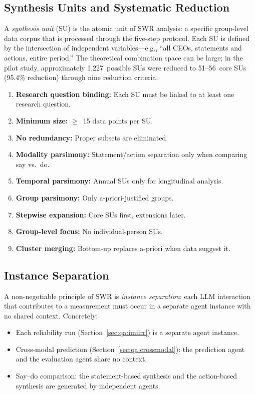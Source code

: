 \documentclass[11pt,a4paper]{article}
\begin{document}
\subsection{Synthesis Units and Systematic Reduction}
\label{sec:method:su}

A \emph{synthesis unit} (SU) is the atomic unit of SWR analysis: a specific group-level data corpus that is processed through the five-step protocol. Each SU is defined by the intersection of independent variables---e.g., ``all CEOs, statements and actions, entire period.'' The theoretical combination space can be large; in the pilot study, approximately 1,227~possible SUs were reduced to 51--56~core SUs (95.4\% reduction) through nine reduction criteria:

\begin{enumerate}[nosep]
  \item \textbf{Research question binding:} Each SU must be linked to at least one research question.
  \item \textbf{Minimum size:} $\geq$~15 data points per SU.
  \item \textbf{No redundancy:} Proper subsets are eliminated.
  \item \textbf{Modality parsimony:} Statement/action separation only when comparing say vs.\ do.
  \item \textbf{Temporal parsimony:} Annual SUs only for longitudinal analysis.
  \item \textbf{Group parsimony:} Only a-priori-justified groups.
  \item \textbf{Stepwise expansion:} Core SUs first, extensions later.
  \item \textbf{Group-level focus:} No individual-person SUs.
  \item \textbf{Cluster merging:} Bottom-up replaces a-priori when data suggest it.
\end{enumerate}


\subsection{Instance Separation}
\label{sec:method:instance}

A non-negotiable principle of SWR is \emph{instance separation}: each LLM interaction that contributes to a measurement must occur in a separate agent instance with no shared context. Concretely:

\begin{itemize}[nosep]
  \item Each reliability run (Section~\ref{sec:qa:imiirr}) is a separate agent instance.
  \item Cross-modal prediction (Section~\ref{sec:qa:crossmodal}): the prediction agent and the evaluation agent share no context.
  \item Say--do comparison: the statement-based synthesis and the action-based synthesis are generated by independent agents.
\end{itemize}
\end{document}
